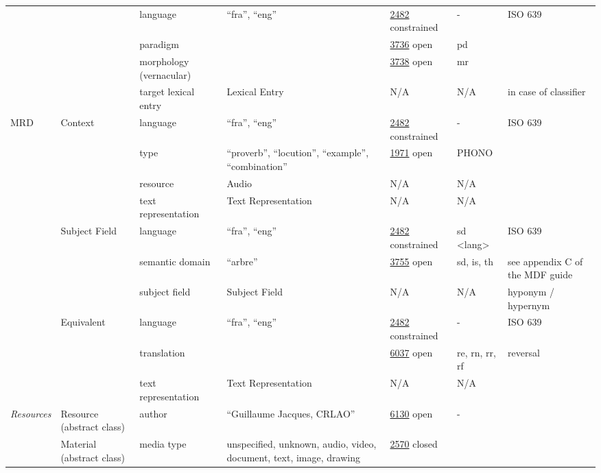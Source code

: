 \documentclass[a4paper,12pt]{article}
\begin{document}
\begin{center}
\begin{longtable}{*7{p{2cm}}}
& & language & ``fra'', ``eng'' & \href{http://www.isocat.org/datcat/DC-2482}{2482} constrained & - & ISO 639 \\ \cmidrule{3-7}
& & paradigm & & \href{http://www.isocat.org/datcat/DC-3736}{3736} open & pd & \\ \cmidrule{3-7}
& & morphology (vernacular) & & \href{http://www.isocat.org/datcat/DC-3738}{3738} open & mr & \\ \cmidrule{3-7}
& & target lexical entry & Lexical Entry & N/A & N/A & in case of classifier \\ \cmidrule{1-7}
\multirow{9}{2cm}{MRD} & \multirow{3}{2cm}{Context} & language & ``fra'', ``eng'' & \href{http://www.isocat.org/datcat/DC-2482}{2482} constrained & - & ISO 639 \\ \cmidrule{3-7}
& & type & ``proverb'', ``locution'', ``example'', ``combination'' & \href{http://www.isocat.org/datcat/DC-1971}{1971} open & PHONO & \\ \cmidrule{3-7}
& & resource & Audio & N/A & N/A & \\ \cmidrule{3-7}
& & text representation & Text Re\-pre\-sen\-ta\-tion & N/A & N/A & \\ \cmidrule{2-7}
& \multirow{3}{2cm}{Subject Field} & language & ``fra'', ``eng'' & \href{http://www.isocat.org/datcat/DC-2482}{2482} constrained & sd \textless lang\textgreater & ISO 639 \\ \cmidrule{3-7}
& & semantic domain & ``arbre'' & \href{http://www.isocat.org/datcat/DC-3755}{3755} open & sd, is, th & see appendix C of the MDF guide \\ \cmidrule{3-7}
& & subject field & Subject Field & N/A & N/A & hyponym / hypernym \\ \cmidrule{2-7}
& \multirow{3}{2cm}{Equivalent} & language & ``fra'', ``eng'' & \href{http://www.isocat.org/datcat/DC-2482}{2482} constrained & - & ISO 639 \\ \cmidrule{3-7}
& & translation & & \href{http://www.isocat.org/datcat/DC-6037}{6037} open & re, rn, rr, rf & reversal \\ \cmidrule{3-7}
& & text representation & Text Re\-pre\-sen\-ta\-tion & N/A & N/A & \\ \cmidrule{1-7}
\multirow{19}{2cm}{\textit{Resources}} & \multirow{1}{2cm}{Resource (abstract class)} & author & ``Guillaume Jacques, CRLAO'' & \href{http://www.isocat.org/datcat/DC-6130}{6130} open & - & \\ \cmidrule{2-7}
& \multirow{2}{2cm}{Material (abstract class)} & media type & unspecified, unknown, audio, video, document, text, image, drawing & \href{http://www.isocat.org/datcat/DC-2570}{2570} closed & & \\ \cmidrule{3-7}

\end{longtable}
\end{center}
\end{document}

